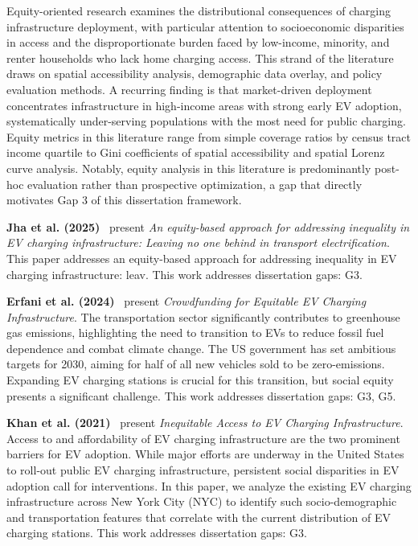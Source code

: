 \documentclass[letterpaper, 12pt, oneside, doublespacing]{Thesis}
\begin{document}
Equity-oriented research examines the distributional consequences of charging infrastructure deployment, with particular attention to socioeconomic disparities in access and the disproportionate burden faced by low-income, minority, and renter households who lack home charging access. This strand of the literature draws on spatial accessibility analysis, demographic data overlay, and policy evaluation methods. A recurring finding is that market-driven deployment concentrates infrastructure in high-income areas with strong early EV adoption, systematically under-serving populations with the most need for public charging. Equity metrics in this literature range from simple coverage ratios by census tract income quartile to Gini coefficients of spatial accessibility and spatial Lorenz curve analysis. Notably, equity analysis in this literature is predominantly post-hoc evaluation rather than prospective optimization, a gap that directly motivates Gap 3 of this dissertation framework.


\noindent \textbf{Jha et al. (2025)}~\cite{an_equity-based_2025} present \textit{An equity-based approach for addressing inequality in EV charging infrastructure: Leaving no one behind in transport electrification}. This paper addresses an equity-based approach for addressing inequality in EV charging infrastructure: leav. This work addresses dissertation gaps: G3.



\noindent \textbf{Erfani et al. (2024)}~\cite{crowdfunding_for_2024} present \textit{Crowdfunding for Equitable EV Charging Infrastructure}. The transportation sector significantly contributes to greenhouse gas emissions, highlighting the need to transition to EVs to reduce fossil fuel dependence and combat climate change. The US government has set ambitious targets for 2030, aiming for half of all new vehicles sold to be zero-emissions. Expanding EV charging stations is crucial for this transition, but social equity presents a significant challenge. This work addresses dissertation gaps: G3, G5.



\noindent \textbf{Khan et al. (2021)}~\cite{inequitable_access_2021} present \textit{Inequitable Access to EV Charging Infrastructure}. Access to and affordability of EV charging infrastructure are the two prominent barriers for EV adoption. While major efforts are underway in the United States to roll-out public EV charging infrastructure, persistent social disparities in EV adoption call for interventions. In this paper, we analyze the existing EV charging infrastructure across New York City (NYC) to identify such socio-demographic and transportation features that correlate with the current distribution of EV charging stations. This work addresses dissertation gaps: G3.
\end{document}
